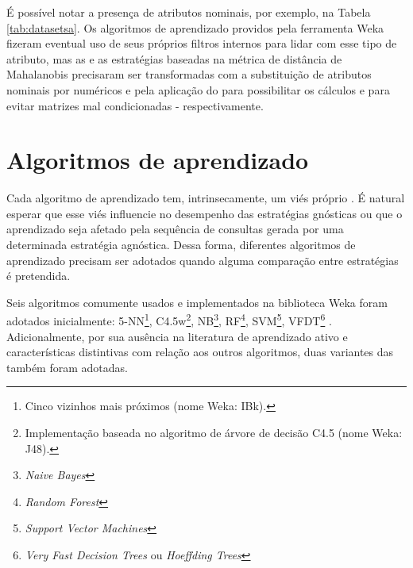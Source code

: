 

É possível notar a presença de atributos nominais, por exemplo, na Tabela \ref{tab:datasetsa}.
Os algoritmos de aprendizado providos pela ferramenta
Weka \citep{journals/sigkdd/HallFHPRW09}
fizeram eventual uso de seus próprios filtros internos para lidar com esse tipo de atributo,
mas as \elms e as estratégias baseadas na métrica de distância de Mahalanobis precisaram ser
transformadas com a substituição de atributos nominais por numéricos e pela aplicação do
 \citep{kreyszig2007advanced}
para possibilitar os cálculos e para evitar matrizes mal condicionadas - respectivamente.




\section{Algoritmos de aprendizado}\label{learners}
Cada algoritmo de aprendizado tem, intrinsecamente, um viés próprio .
É natural esperar que esse viés influencie no desempenho das estratégias gnósticas
ou que o aprendizado seja afetado pela sequência de consultas gerada por uma
determinada estratégia agnóstica.
Dessa forma, diferentes algoritmos de aprendizado
precisam ser adotados quando alguma comparação entre estratégias é pretendida.

Seis algoritmos comumente usados e implementados na biblioteca Weka foram adotados
inicialmente:
5-NN\footnote{Cinco vizinhos mais próximos (nome Weka: IBk).},
C4.5w\footnote{Implementação baseada no algoritmo de árvore de decisão C4.5 (nome Weka: J48).},
NB\footnote{\textit{Naive Bayes}},
RF\footnote{\textit{Random Forest}},
SVM\footnote{\textit{Support Vector Machines}},
VFDT\footnote{\textit{Very Fast Decision Trees} ou \textit{Hoeffding Trees}}
\citep{journals/tit/Hart68,
books/mk/Quinlan93,
conf/ecml/Lewis98,
journals/ml/Breiman01,
hearst1998support,
conf/kdd/DomingosH00}.
Adicionalmente, por sua ausência na literatura de aprendizado ativo e características
distintivas com relação aos outros algoritmos,
duas variantes das \elms também foram adotadas.

